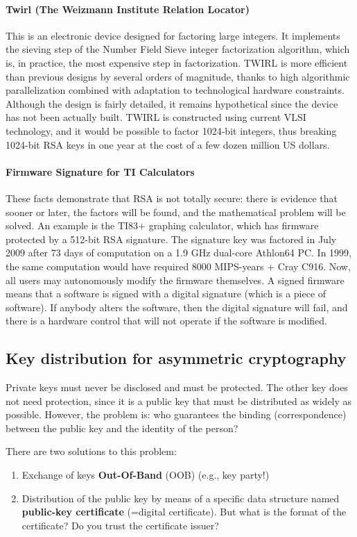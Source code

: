 \paragraph{Twirl (The Weizmann Institute Relation Locator)}
This is an electronic device designed for factoring large integers. It implements the sieving step of the Number Field Sieve integer factorization algorithm, which is, in practice, the most expensive step in factorization. TWIRL is more efficient than previous designs by several orders of magnitude, thanks to high algorithmic parallelization combined with adaptation to technological hardware constraints. Although the design is fairly detailed, it remains hypothetical since the device has not been actually built. TWIRL is constructed using current VLSI technology, and it would be possible to factor 1024-bit integers, thus breaking 1024-bit RSA keys in one year at the cost of a few dozen million US dollars.


\paragraph{Firmware Signature for TI Calculators}
These facts demonstrate that RSA is not totally secure: there is evidence that sooner or later, the factors will be found, and the mathematical problem will be solved. An example is the TI83+ graphing calculator, which has firmware protected by a 512-bit RSA signature. The signature key was factored in July 2009 after 73 days of computation on a 1.9 GHz dual-core Athlon64 PC. In 1999, the same computation would have required 8000 MIPS-years + Cray C916. Now, all users may autonomously modify the firmware themselves. A signed firmware means that a software is signed with a digital signature (which is a piece of software). If anybody alters the software, then the digital signature will fail, and there is a hardware control that will not operate if the software is modified.


\subsection{Key distribution for asymmetric cryptography}
Private keys must never be disclosed and must be protected. The other key does not need protection, since it is a public key that must be distributed as widely as possible. However, the problem is: who guarantees the binding (correspondence) between the public key and the identity of the person?

There are two solutions to this problem:
\begin{enumerate}
    \item Exchange of keys \textbf{Out-Of-Band} (OOB) (e.g., key party!)
    \item Distribution of the public key by means of a specific data structure named \textbf{public-key certificate} (=digital certificate).
          But what is the format of the certificate? Do you trust the certificate issuer?
\end{enumerate}


